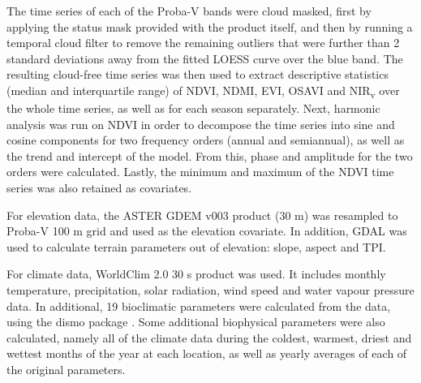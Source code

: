 \documentclass[review,authoryear,3p]{elsarticle}
\begin{document}
The time series of each of the Proba-V bands were cloud masked, first by applying the status mask provided with the product itself, and then by running a temporal cloud filter to remove the remaining outliers that were further than 2 standard deviations away from the fitted \ac{LOESS} curve over the blue band.
The resulting cloud-free time series was then used to extract descriptive statistics (median and interquartile range) of NDVI, NDMI, EVI, OSAVI and NIR\textsubscript{v} over the whole time series, as well as for each season separately.
Next, harmonic analysis was run on NDVI in order to decompose the time series into sine and cosine components for two frequency orders (annual and semiannual), as well as the trend and intercept of the model.
From this, phase and amplitude for the two orders were calculated.
Lastly, the minimum and maximum of the NDVI time series was also retained as covariates.



For elevation data, the ASTER GDEM v003 \citep{ASTGTM003} product (30 m) was resampled to Proba-V 100 m grid and used as the elevation covariate.
In addition, GDAL was used to calculate terrain parameters out of elevation: slope, aspect and \ac{TPI}.


For climate data, WorldClim 2.0 30 s product \citep{worldclim2} was used.
It includes monthly temperature, precipitation, solar radiation, wind speed and water vapour pressure data.
In additional, 19 bioclimatic parameters were calculated from the data, using the dismo package \citep{dismo}.
Some additional biophysical parameters were also calculated, namely all of the climate data during the coldest, warmest, driest and wettest months of the year at each location, as well as yearly averages of each of the original parameters.
\end{document}
